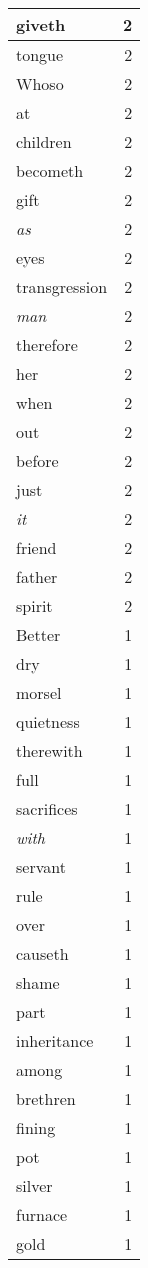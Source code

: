 \begin{center}
\begin{longtable}{l|r}
giveth & 2\\ \hline 
tongue & 2\\ \hline 
Whoso & 2\\ \hline 
at & 2\\ \hline 
children & 2\\ \hline 
becometh & 2\\ \hline 
gift & 2\\ \hline 
\emph{as} & 2\\ \hline 
eyes & 2\\ \hline 
transgression & 2\\ \hline 
\emph{man} & 2\\ \hline 
therefore & 2\\ \hline 
her & 2\\ \hline 
when & 2\\ \hline 
out & 2\\ \hline 
before & 2\\ \hline 
just & 2\\ \hline 
\emph{it} & 2\\ \hline 
friend & 2\\ \hline 
father & 2\\ \hline 
spirit & 2\\ \hline 
Better & 1\\ \hline 
dry & 1\\ \hline 
morsel & 1\\ \hline 
quietness & 1\\ \hline 
therewith & 1\\ \hline 
full & 1\\ \hline 
sacrifices & 1\\ \hline 
\emph{with} & 1\\ \hline 
servant & 1\\ \hline 
rule & 1\\ \hline 
over & 1\\ \hline 
causeth & 1\\ \hline 
shame & 1\\ \hline 
part & 1\\ \hline 
inheritance & 1\\ \hline 
among & 1\\ \hline 
brethren & 1\\ \hline 
fining & 1\\ \hline 
pot & 1\\ \hline 
silver & 1\\ \hline 
furnace & 1\\ \hline 
gold & 1\\ \hline 

\end{longtable}
\end{center}

